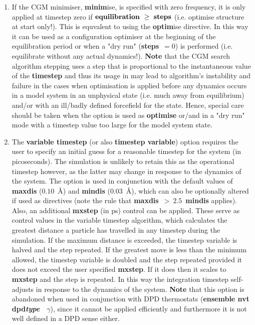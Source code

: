 \begin{enumerate}
\item If the CGM minimiser, {\bf minim}ise, is specified with zero
frequency, it is only applied at timestep zero if
${\bf equilibration}~\ge~{\bf steps}$ (i.e. optimise structure at
start only!).  This is equvalent to using the {\bf optim}ise
directive.  In this way it can be used as a configuration
optimiser at the beginning of the equilibration period or when
a "dry run" ({\bf steps}~$= 0$) is performed (i.e. equilibrate
without any actual dynamics!).  {\bf Note} that the CGM search
algorithm stepping uses a step that is proportional to the
instantaneous value of the {\bf timestep} and thus its usage in
may lead to algorithm's instability and failure in the cases when
optimisation is applied before any dynamics occurs in a model
system in an unphysical state (i.e. much away from equilibrium)
and/or with an ill/badly defined forcefield for the state.  Hence,
special care should be taken when the option is used as
{\bf optimise} or/and in a "dry run" mode with a timestep value too large for the model system state.

\item The {\bf variable timestep} (or also {\bf timestep variable})
option requires the user to specify an initial guess for a
reasonable timestep for the system (in picoseconds).  The simulation
is unlikely to retain this as the operational timestep however, as
the latter may change in response to the dynamics of the system.  The
option is used in conjunction with the default values of {\bf maxdis}
($0.10$~\AA) and {\bf mindis} ($0.03$~\AA), which can also be
optionally altered if used as directives (note the rule that
{\bf maxdis}~$>~2.5$~{\bf mindis} applies).  Also, an additional
{\bf mxstep} (in ps) control can be applied.  These serve as
control values in the variable timestep algorithm, which calculates
the greatest distance a particle has travelled in any timestep
during the simulation.  If the maximum distance is exceeded, the
timestep variable is halved and the step repeated.  If the greatest
move is less than the minimum allowed, the timestep variable is
doubled and the step repeated provided it does not exceed the
user specified {\bf mxstep}.  If it does then it scales to
{\bf mxstep} and the step is repeated.  In this way the integration
timestep self-adjusts in response to the dynamics of the system.
{\bf Note} that this option is abandoned when used in conjunction with
DPD thermostats ({\bf ensemble nvt dpd}\textrm{\textit{\textbf{type}}}~~$\gamma$),
since it cannot be applied efficiently and furthermore it is not
well defined in a DPD sense either.


\end{enumerate}
